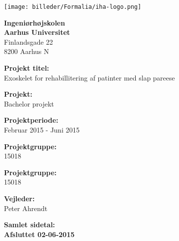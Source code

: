
{}

\begin{minipage}[t]{0.48\textwidth}
\vspace*{14pt}			%
\texttt{[image: billeder/Formalia/iha-logo.png]} 
\end{minipage}
\hfill

\vspace*{1cm}

\begin{minipage}[t]{0.48\textwidth}

{\small 
\flushleft
\textbf{Ingeniørhøjskolen}\\
\textbf{Aarhus Universitet}  \\
Finlandsgade 22 \\
8200 Aarhus N \\
}

\vspace*{1cm}

\textbf{Projekt titel:} \\[5pt]\bigskip\hspace{2ex}
Exoskelet for rehabillitering af patinter med slap pareese 

\textbf{Projekt:} \\[5pt]\bigskip\hspace{2ex}
Bachelor projekt

\textbf{Projektperiode:} \\[5pt]\bigskip\hspace{2ex}
Februar 2015 - Juni 2015

\textbf{Projektgruppe:} \\[5pt]\bigskip\hspace{2ex}
15018

\textbf{Projektgruppe:} \\[5pt]\bigskip\hspace{2ex}
15018


\textbf{Vejleder:} \\[5pt]\hspace*{2ex}
Peter Ahrendt \\\bigskip\hspace{2ex}

\vspace*{1cm}

\textbf{Samlet sidetal: \pageref{LastPage}} \\
\textbf{Afsluttet 02-06-2015}


\end{minipage}
\hfill
\vfill

